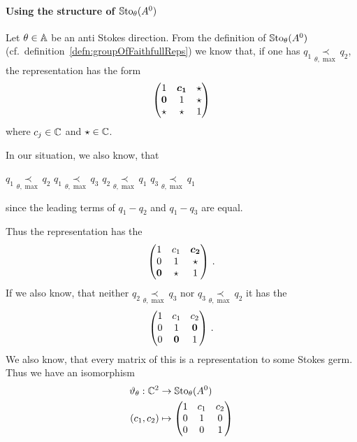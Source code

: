 \paragraph{Using the structure of $\operatorname{\mathbb{S}to}_\theta(A^0)$}
\begin{exmp}
  Let $\theta\in\mathbb{A}$ be an anti Stokes direction.
  From the definition of $\operatorname{\mathbb{S}to}_\theta(A^0)$ (cf.\
  definition~\ref{defn:groupOfFaithfullReps}) we know that, if one has $q_1
  \underset{\theta,\max}{\prec} q_2$, the representation has the form
  \[
    \begin{pmatrix}
      1 & \text{\boldmath$c_1$} & \star
    \\\text{\boldmath$0$} & 1 & \star
    \\\star & \star & 1
    \end{pmatrix}
  \]
  where $c_j\in\mathbb{C}$ and $\star\in\mathbb{C}$.
  \begin{s-rem}
    In our situation, we also know, that
    \begin{einr}
      $q_1 \underset{\theta,\max}{\prec} q_2$
      \Leftrightarrow{}
      $q_1 \underset{\theta,\max}{\prec} q_3$
      \qquad {} \qquad
      $q_2 \underset{\theta,\max}{\prec} q_1$
      \Leftrightarrow{}
      $q_3 \underset{\theta,\max}{\prec} q_1$
    \end{einr}
    since the leading terms of $q_1-q_2$ and $q_1-q_3$ are equal.
  \end{s-rem}
  Thus the representation has the 
  \[
    \begin{pmatrix}
      1 & c_1 & \text{\boldmath$c_2$}
    \\0 & 1 & \star
    \\\text{\boldmath$0$} & \star & 1
    \end{pmatrix}\,.
  \]
  If we also know, that neither $q_2 \underset{\theta,\max}{\prec} q_3$ nor
  $q_3 \underset{\theta,\max}{\prec} q_2$ it has the \rewrite{form}
  \[
    \begin{pmatrix}
      1 & c_1 & c_2
    \\0 & 1 & \text{\boldmath$0$}
    \\0 & \text{\boldmath$0$} & 1
    \end{pmatrix}\,.
  \]
  We also know, that every matrix of this  is a representation to
  some Stokes germ.
  Thus we have an isomorphism
  \begin{align*}
    \vartheta_\theta:\mathbb{C}^2 &\to \operatorname{\mathbb{S}to}_\theta(A^0)
  \\(c_1,c_2)&\mapsto
    \begin{pmatrix}
      1 & c_1 & c_2
    \\0 & 1 & 0
    \\0 & 0 & 1
    \end{pmatrix}
  \end{align*}
\end{exmp}
